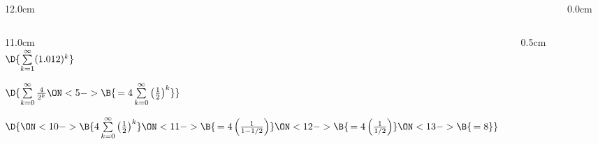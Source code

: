 \begin{frame}
\frametitle{}
\scriptsize
\begin{columns}
\begin{column}{12.0cm}

\vspace{0.2cm}

\begin{columns}
\begin{column}{11.0cm}
\\

$\D{\sum \limits_{k = 1}^{\infty} (1.012)^k}$ \qquad 
{} \quad 
{}

\vspace{2.0cm}

$\D{\sum \limits_{k = 0}^{\infty} \frac{4}{2^k}
\ON<5->{\B{\, = 4\sum \limits_{k = 0}^{\infty} \left(\frac{1}{2}\right)^k}}
}$\qquad
{} \quad 
{}

\vspace{0.6cm}


\vspace{0.6cm}

$\D{
\ON<10->{\B{4\sum \limits_{k = 0}^{\infty} \left(\frac{1}{2}\right)^k}} 
\ON<11->{\B{\, = 4\left(\frac{1}{1-1/2}\right)}}
\ON<12->{\B{\, = 4\left(\frac{1}{1/2}\right)}}
\ON<13->{\B{\, = 8}}
}$

\vspace{3.2cm}

\end{column}
\begin{column}{0.5cm}
	
\end{column}
\end{columns}
\end{column}
\begin{column}{0.0cm}\end{column}
\end{columns}
\end{frame}

